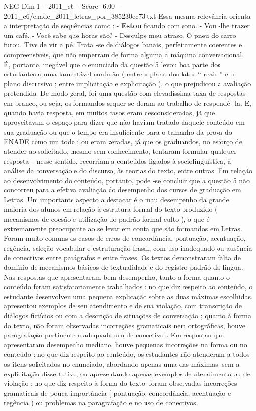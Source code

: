 \begin{textsample}{NEG Dim 1 – 2011\_c6 – Score -6.00 – 2011\_c6/enade\_2011\_letras\_por\_385230ec73.txt}
Essa mesma relevância orienta a interpretação de sequências como : - \textbf{Estou} ficando com sono. - Vou -lhe trazer um café. - Você sabe que horas são? - Desculpe meu atraso.
O pneu do carro furou.
Tive de vir a pé.
Trata -se de diálogos banais, perfeitamente coerentes e compreensíveis, que não emperram de forma alguma a máquina conversacional.
É, portanto, inegável que o enunciado da questão 5 levou boa parte dos estudantes a uma lamentável confusão ( entre o plano dos fatos “ reais ” e o plano discursivo ; entre implicitação e explicitação ), o que prejudicou a avaliação pretendida.
De modo geral, foi uma questão com elevadíssima taxa de respostas em branco, ou seja, os formandos sequer se deram ao trabalho de respondê -la.
E, quando havia resposta, em muitos casos eram desconsideradas, já que aproveitavam o espaço para dizer que não haviam tratado daquele conteúdo em sua graduação ou que o tempo era insuficiente para o tamanho da prova do ENADE como um todo ; ou eram zeradas, já que os graduandos, no esforço de atender ao solicitado, mesmo sem conhecimento, tentaram formular qualquer resposta – nesse sentido, recorriam a conteúdos ligados à sociolinguística, à análise da conversação e do discurso, às teorias do texto, entre outras.
Em relação ao desenvolvimento do conteúdo, portanto, pode -se concluir que a questão 5 não concorreu para a efetiva avaliação do desempenho dos cursos de graduação em Letras.
Um importante aspecto a destacar é o mau desempenho da grande maioria dos alunos em relação à estrutura formal do texto produzido ( mecanismos de coesão e utilização do padrão formal culto ), o que é extremamente preocupante ao se levar em conta que são formandos em Letras.
Foram muito comuns os casos de erros de concordância, pontuação, acentuação, regência, seleção vocabular e estruturação frasal, com uso inadequado ou ausência de conectivos entre parágrafos e entre frases.
Os textos demonstraram falta de domínio de mecanismos básicos de textualidade e do registro padrão da língua.
Nas respostas que apresentaram bom desempenho, tanto a forma quanto o conteúdo foram satisfatoriamente trabalhados : no que diz respeito ao conteúdo, o estudante desenvolveu uma pequena explicação sobre as duas máximas escolhidas, apresentou exemplos de seu atendimento e de sua violação, com transcrição de diálogos fictícios ou com a descrição de situações de conversação ; quanto à forma do texto, não foram observadas incorreções gramaticais nem ortográficas, houve paragrafação pertinente e adequado uso de conectivos.
Em respostas que apresentaram desempenho mediano, houve pequenas incorreções na forma ou no conteúdo : no que diz respeito ao conteúdo, os estudantes não atenderam a todos os itens solicitados no enunciado, abordando apenas uma das máximas, sem a explicitação dissertativa, ou apresentando apenas exemplos de atendimento ou de violação ; no que diz respeito à forma do texto, foram observadas incorreções gramaticais de pouca importância ( pontuação, concordância, acentuação e regência ) ou problemas na paragrafação e no uso de conectivos.

\end{textsample}
